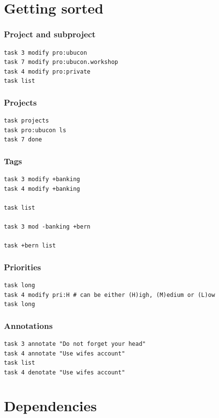 \documentclass[t]{beamer}
\begin{document}
\section{Getting sorted}

\begin{frame}[fragile]\frametitle{Project and subproject}
    \vfill
    \begin{lstlisting}
task 3 modify pro:ubucon
task 7 modify pro:ubucon.workshop
task 4 modify pro:private
task list
\end{lstlisting}
\end{frame}

\begin{frame}[fragile]\frametitle{Projects}
    \vfill
    \begin{lstlisting}
task projects
task pro:ubucon ls
task 7 done
\end{lstlisting}
\end{frame}

\begin{frame}[fragile]\frametitle{Tags}
    \vfill
    \begin{lstlisting}
task 3 modify +banking
task 4 modify +banking

task list

task 3 mod -banking +bern

task +bern list
\end{lstlisting}
\end{frame}

\begin{frame}[fragile]\frametitle{Priorities}
    \vfill
    \begin{lstlisting}
task long
task 4 modify pri:H # can be either (H)igh, (M)edium or (L)ow
task long
\end{lstlisting}
\end{frame}

\begin{frame}[fragile]\frametitle{Annotations}
    \vfill
    \begin{lstlisting}
task 3 annotate "Do not forget your head"
task 4 annotate "Use wifes account"
task list
task 4 denotate "Use wifes account"
\end{lstlisting}
\end{frame}

\section{Dependencies}
\end{document}
